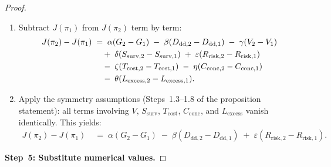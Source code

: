 \documentclass[12pt,openany]{book}
\numberwithin{equation}{chapter}
\theoremstyle{plain}
\theoremstyle{definition}
\theoremstyle{remark}
\numberwithin{equation}{chapter}
\theoremstyle{plain}
\begin{document}
\begin{proof}
\begin{enumerate}
  \item Subtract $J(\pi_1)$ from $J(\pi_2)$ term by term:
        \begin{align}
          J(\pi_2) - J(\pi_1)
          &\;=\; \alpha(G_2 - G_1)
                 \;-\; \beta(D_{\mathrm{dd},2} - D_{\mathrm{dd},1})
                 \;-\; \gamma(V_2 - V_1) \notag\\
          &\quad  \;+\; \delta(S_{\mathrm{surv},2} - S_{\mathrm{surv},1})
                 \;+\; \varepsilon(R_{\mathrm{risk},2}
                        - R_{\mathrm{risk},1}) \notag\\
          &\quad  \;-\; \zeta(T_{\mathrm{cost},2} - T_{\mathrm{cost},1})
                 \;-\; \eta(C_{\mathrm{conc},2} - C_{\mathrm{conc},1})
                 \notag\\
          &\quad  \;-\; \theta(L_{\mathrm{excess},2}
                        - L_{\mathrm{excess},1}).
        \end{align}
  \item Apply the symmetry assumptions (Steps~1.3--1.8 of the
        proposition statement): all terms involving $V$, $S_{\mathrm{surv}}$,
        $T_{\mathrm{cost}}$, $C_{\mathrm{conc}}$, and $L_{\mathrm{excess}}$
        vanish identically.  This yields:
        \begin{align}
          J(\pi_2) - J(\pi_1)
          &\;=\; \alpha(G_2 - G_1)
                 \;-\; \beta(D_{\mathrm{dd},2} - D_{\mathrm{dd},1})
                 \;+\; \varepsilon(R_{\mathrm{risk},2}
                        - R_{\mathrm{risk},1}).
                 \label{eq:diff-reduced}
        \end{align}
\end{enumerate}

\medskip
\noindent\textbf{Step~5: Substitute numerical values.}


\end{proof}
\end{document}
